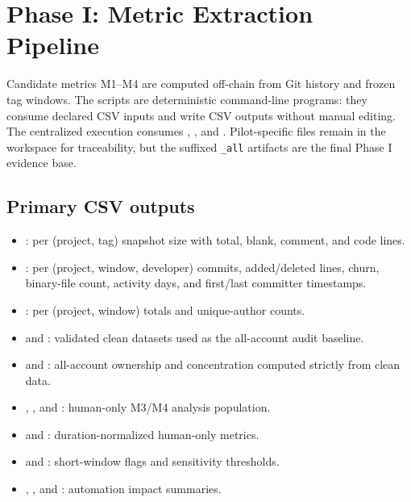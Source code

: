 \section{Phase I: Metric Extraction Pipeline}
\label{sec:phase1_pipeline}

Candidate metrics M1--M4 are computed off-chain from Git history and frozen tag windows.
The scripts are deterministic command-line programs: they consume declared CSV inputs and
write CSV outputs without manual editing. The centralized execution consumes
, , and
. Pilot-specific files remain in the workspace for traceability,
but the suffixed \texttt{\_all} artifacts are the final Phase I evidence base.

\subsection{Primary CSV outputs}
\label{sec:phase1_outputs}

\begin{itemize}[leftmargin=*]
  \item {}: per (project, tag) snapshot size with total, blank, comment, and code lines.
  \item {}: per (project, window, developer) commits, added/deleted lines, churn, binary-file count, activity days, and first/last committer timestamps.
  \item {}: per (project, window) totals and unique-author counts.
  \item {} and : validated clean datasets used as the all-account audit baseline.
  \item {} and : all-account ownership and concentration computed strictly from clean data.
  \item {}, , and : human-only M3/M4 analysis population.
  \item {} and : duration-normalized human-only metrics.
  \item {} and : short-window flags and sensitivity thresholds.
  \item {}, , and : automation impact summaries.
\end{itemize}

